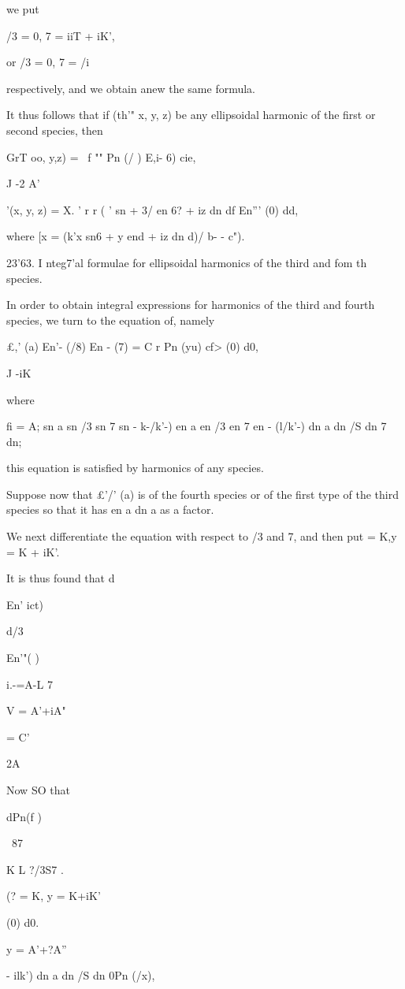{{{{{{{{we put

/3 = 0, 7 = iiT + iK',

or /3 = 0, 7 = /i

respectively, and we obtain anew the same formula.

It thus follows that if (th'" x, y, z) be any ellipsoidal harmonic of
the first or second species, then

GrT oo, y,z) = \ f "" Pn (/ ) E,i- 6) cie,

J -2 A'

  '(x, y, z) = X. ' r r ( ' sn + 3/ en 6? + iz dn df En''' (0) dd,

where [x = (k'x sn6 + y end + iz dn d)/\/ b- - c").

23'63. I nteg7'al formulae for ellipsoidal harmonics of the third and
fom th species.

In order to obtain integral expressions for harmonics of the third and
fourth species, we turn to the equation of, namely

£,' (a) En'- (/8) En - (7) = C r Pn (yu) cf> (0) d0,

J -iK

where

fi = A; sn a sn /3 sn 7 sn - k-/k'-) en a en /3 en 7 en - (l/k'-) dn a
dn /S dn 7 dn;

this equation is satisfied by harmonics of any species.

Suppose now that £'/' (a) is of the fourth species or of the first
type of the third species so that it has en a dn a as a factor.

We next differentiate the equation with respect to /3 and 7, and then
put = K,y = K + iK'.

It is thus found that d

En' ict)

d/3

En'"( )

i.-=A-L 7

V = A'+iA"

= C'

2A

Now SO that

dPn(f )

\ 87 \

K L ?/3S7 .

(? = K, y = K+iK'

(0) d0.

y = A'+?A''

- ilk') dn a dn /S dn 0Pn (/x),

}}}}}}}}
